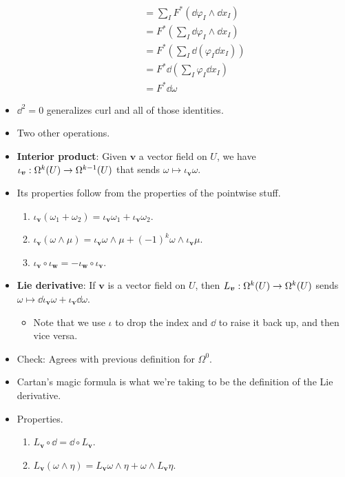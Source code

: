 \documentclass[../notes.tex]{subfiles}
\begin{document}
\begin{itemize}
\begin{itemize}
\begin{align*}
            &= \sum_IF^*(\dd{\varphi_I}\wedge\dd{x_I})\\
            &= F^*\left( \sum_I\dd{\varphi_I}\wedge\dd{x_I} \right)\\
            &= F^*\left( \sum_I\dd(\varphi_I\dd{x_I}) \right)\\
            &= F^*\dd\left( \sum_I\varphi_I\dd{x_I} \right)\\
            &= F^*\dd{\omega}
        \end{align*}
    \end{itemize}
    \item $\dd^2=0$ generalizes curl and all of those identities.
    \item Two other operations.
    \item \textbf{Interior product}: Given $\bm{v}$ a vector field on $U$, we have $\iota_{\bm{v}}:\ome[k]{U}\to\ome[k-1]{U}$ that sends $\omega\mapsto\iota_{\bm{v}}\omega$.
    \item Its properties follow from the properties of the pointwise stuff.
    \begin{enumerate}
        \item $\iota_{\bm{v}}(\omega_1+\omega_2)=\iota_{\bm{v}}\omega_1+\iota_{\bm{v}}\omega_2$.
        \item $\iota_{\bm{v}}(\omega\wedge\mu)=\iota_{\bm{v}}\omega\wedge\mu+(-1)^k\omega\wedge\iota_{\bm{v}}\mu$.
        \item $\iota_{\bm{v}}\circ\iota_{\bm{w}}=-\iota_{\bm{w}}\circ\iota_{\bm{v}}$.
    \end{enumerate}
    \item \textbf{Lie derivative}: If $\bm{v}$ is a vector field on $U$, then $L_{\bm{v}}:\ome[k]{U}\to\ome[k]{U}$ sends $\omega\mapsto\dd{\iota_{\bm{v}}\omega}+\iota_{\bm{v}}\dd{\omega}$.
    \begin{itemize}
        \item Note that we use $\iota$ to drop the index and $\dd$ to raise it back up, and then vice versa.
    \end{itemize}
    \item Check: Agrees with previous definition for $\Omega^0$.
    \item Cartan's magic formula is what we're taking to be the definition of the Lie derivative.
    \item Properties.
    \begin{enumerate}
        \item $L_{\bm{v}}\circ\dd=\dd\circ L_{\bm{v}}$.
        \item $L_{\bm{v}}(\omega\wedge\eta)=L_{\bm{v}}\omega\wedge\eta+\omega\wedge L_{\bm{v}}\eta$.

\end{enumerate}
\end{itemize}
\end{document}

